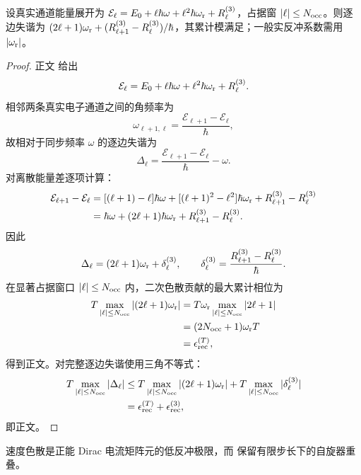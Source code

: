 \begin{proposition}[格点色散差的反冲相位界]
设真实通道能量展开为 $\mathcal E_\ell=E_0+\ell\hbar\omega+\ell^2\hbar\omega_{\rm r}+R_\ell^{(3)}$，占据窗 $|\ell|\le N_{\rm occ}$。则逐边失谐为 $(2\ell+1)\omega_{\rm r}+(R_{\ell+1}^{(3)}-R_\ell^{(3)})/\hbar$，其累计模满足；一般实反冲系数需用 $|\omega_{\rm r}|$。
\end{proposition}
\begin{proof}
正文 给出
\[
\mathcal E_\ell
=E_0+\ell\hbar\omega+\ell^2\hbar\omega_{\rm r}+R_\ell^{(3)}.
\]
相邻两条真实电子通道之间的角频率为
\[
\omega_{\ell+1,\ell}
=\frac{\mathcal E_{\ell+1}-\mathcal E_\ell}{\hbar},
\]
故相对于同步频率 $\omega$ 的逐边失谐为
\[
\Delta_\ell
=\frac{\mathcal E_{\ell+1}-\mathcal E_\ell}{\hbar}-\omega.
\]
对离散能量差逐项计算：
\begin{align*}
\mathcal E_{\ell+1}-\mathcal E_\ell
={}&[(\ell+1)-\ell]\hbar\omega
+[(\ell+1)^2-\ell^2]\hbar\omega_{\rm r}
+R_{\ell+1}^{(3)}-R_\ell^{(3)}\\
={}&\hbar\omega+(2\ell+1)\hbar\omega_{\rm r}
+R_{\ell+1}^{(3)}-R_\ell^{(3)}.
\end{align*}
因此
\[
\Delta_\ell
=(2\ell+1)\omega_{\rm r}+\delta_\ell^{(3)},
\qquad
\delta_\ell^{(3)}
=\frac{R_{\ell+1}^{(3)}-R_\ell^{(3)}}{\hbar}.
\]
在显著占据窗口 $|\ell|\le N_{\rm occ}$ 内，二次色散贡献的最大累计相位为
\begin{align*}
T\max_{|\ell|\le N_{\rm occ}}
|(2\ell+1)\omega_{\rm r}|
&=T\omega_{\rm r}
\max_{|\ell|\le N_{\rm occ}}|2\ell+1|\\
&=(2N_{\rm occ}+1)\omega_{\rm r}T\\
&=\epsilon_{\rm rec}^{(T)},
\end{align*}
得到正文。对完整逐边失谐使用三角不等式：
\begin{align*}
T\max_{|\ell|\le N_{\rm occ}}|\Delta_\ell|
&\le
T\max_{|\ell|\le N_{\rm occ}}|(2\ell+1)\omega_{\rm r}|
+T\max_{|\ell|\le N_{\rm occ}}|\delta_\ell^{(3)}|\\
&=\epsilon_{\rm rec}^{(T)}+\epsilon_{\rm rec}^{(3)},
\end{align*}
即正文。
\end{proof}


速度色散是正能 Dirac 电流矩阵元的低反冲极限，而 保留有限步长下的自旋器重叠。


